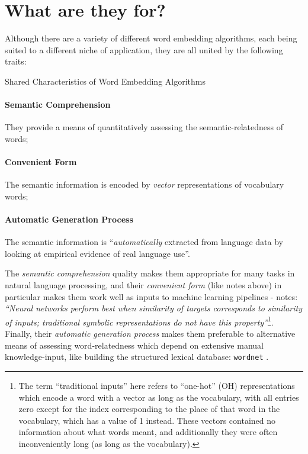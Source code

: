 \documentclass{ucetd}
\begin{document}
\section{What are they for?}
Although there are a variety of different word embedding algorithms, each being suited to a different niche of application, they are all united by the following traits:
\begin{infobox}{Shared Characteristics of Word Embedding Algorithms}
\paragraph{Semantic Comprehension} They provide a means of quantitatively assessing the semantic-relatedness of words;
\paragraph{Convenient Form} The semantic information is encoded by \emph{vector} representations of vocabulary words;
\paragraph{Automatic Generation Process} The semantic information is ``\emph{automatically} extracted from language data by looking at empirical evidence of real language use''.
\end{infobox}
The \emph{semantic comprehension} quality makes them appropriate for many tasks in natural language processing, and their \emph{convenient form} (like \citeauthor{almeida19-word-embed} notes above) in particular makes them work well as inputs to machine learning pipelines -\textcite{shutze-1993-word-space} notes: \emph{``Neural networks perform best when similarity of targets corresponds to similarity of inputs; traditional symbolic representations do not have this property''}\footnote{The term ``traditional inputs'' here refers to ``one-hot'' (OH) representations which encode a word with a vector as long as the vocabulary, with all entries zero except for the index corresponding to the place of that word in the vocabulary, which has a value of 1 instead. These vectors contained no information about what words meant, and additionally they were often inconveniently long (as long as the vocabulary).}. Finally, their \emph{automatic generation process} makes them preferable to alternative means of assessing word-relatedness which depend on extensive manual knowledge-input, like building the structured lexical database: \texttt{wordnet} \parencite{miller-1990-intro-to-wordnet}.
\end{document}
